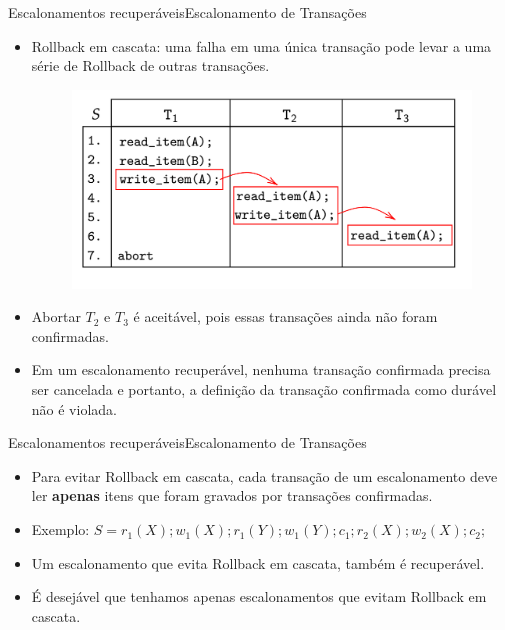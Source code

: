 \documentclass[t]{beamer}
\begin{document}
\begin{ftst}{Escalonamentos recuperáveis}{Escalonamento de Transações}
\small
\begin{itemize}
    \item Rollback em cascata: uma falha em uma única transação pode levar a uma série de Rollback de outras transações.
    \begin{figure}
        \centering
        \includegraphics[scale=0.12]{Figuras_transacoes/21.png}
    \end{figure}
\end{itemize}
\begin{itemize}
    \item Abortar $T_2$ e $T_3$ é aceitável, pois essas transações ainda não foram confirmadas. 
    \item Em um escalonamento recuperável, nenhuma transação confirmada precisa ser cancelada e portanto, a definição da transação confirmada como durável não é violada.
\end{itemize}
\end{ftst}


\begin{ftst}{Escalonamentos recuperáveis}{Escalonamento de Transações}
\begin{itemize}
    \item Para evitar Rollback em cascata, cada transação de um escalonamento deve ler \textbf{apenas} itens que foram gravados por transações confirmadas.
    \item Exemplo: $S = r_1(X); w_1(X); r_1(Y); w_1(Y); c_1; r_2(X); w_2(X); c_2;$
    \vone
    \item Um escalonamento que evita Rollback em cascata, também é recuperável.
    \item É desejável que tenhamos apenas escalonamentos que evitam Rollback em cascata.
\end{itemize}

\end{ftst}
\end{document}
